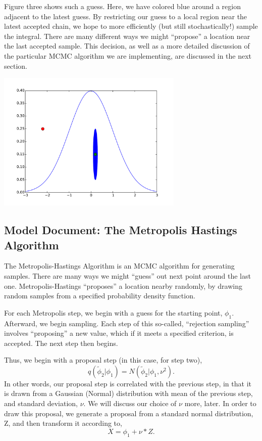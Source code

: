 \documentclass{article}
\begin{document}
Figure three shows such a guess. Here, we have colored blue around a region adjacent to the latest guess. 
By restricting our guess to a local region near the latest accepted chain, we hope to more efficiently (but still stochastically!) 
sample the integral. There are many different ways we might ``propose'' a location near the last accepted sample. This decision, as well as 
a more detailed discussion of the particular MCMC algorithm we are implementing, are discussed in the next section. 

\begin{center}
 \includegraphics[width=3.5in]{figs/norm-corr}
\end{center}

\subsection{Model Document: The Metropolis Hastings Algorithm}

The Metropolis-Hastings Algorithm is an MCMC algorithm for generating samples. There are many ways we might 
``guess'' out next point around the last one. Metropolis-Hastings ``proposes'' a location nearby randomly, by drawing random samples 
from a specified probability density function. 

For each Metropolis step, we begin with a guess for the starting point,
$\phi_1$. Afterward, we begin sampling. Each step of this so-called,
``rejection sampling'' involves ``proposing'' a new value, which if it
meets a specified criterion, is accepted. The next step then begins. 

Thus, we begin with a proposal step (in this case, for step two),
\begin{equation}
 q(\tilde \phi_2 | \phi_1) = N(\tilde \phi_2 | \phi_1, \nu^2).
\end{equation}
In other words, our proposal step is correlated with the previous step,
in that it is drawn from a Gaussian (Normal) distribution with mean of
the previous step, and standard deviation, $\nu$. We will discuss our
choice of $\nu$ more, later. In order to draw this proposal, we generate a 
proposal from a standard normal distribution, Z, and then transform it according to,
\begin{equation}
 X = \phi_1 + \nu*Z.
\end{equation}
\end{document}
